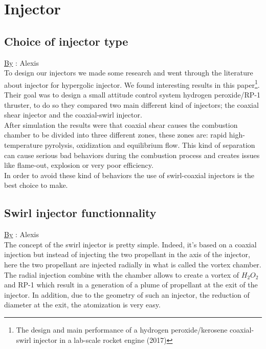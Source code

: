 \section{Injector}
\label{sec:inj}
\subsection{Choice of injector type}
\qquad \underline{By} : Alexis\\

To design our injectors we made some research and went through the literature about injector for hypergolic injector. We found interesting results in this paper\footnote{The design and main performance of a hydrogen peroxide/kerosene coaxial-swirl injector in a lab-scale rocket engine (2017)}. Their goal was to design a small attitude control system hydrogen peroxide/RP-1 thruster, to do so they compared two main different kind of injectors; the coaxial shear injector and the coaxial-swirl injector. \\

After simulation the results were that coaxial shear causes the combustion chamber to be divided into three different zones, these zones are: rapid high-temperature pyrolysis, oxidization and equilibrium flow. This kind of separation can cause serious bad behaviors during the combustion process and creates issues like flame-out, explosion or very poor efficiency. \\
In order to avoid these kind of behaviors the use of swirl-coaxial injectors is the best choice to make. \\

\subsection{Swirl injector functionnality}
\qquad \underline{By} : Alexis\\

The concept of the swirl injector is pretty simple. Indeed, it's based on a coaxial injection but instead of injecting the two propellant in the axis of the injector, here the two propellant are injected radially in what is called the vortex chamber. 
The radial injection combine with the chamber allows to create a vortex of $H_2O_2$ and RP-1 which result in a generation of a plume of propellant at the exit of the injector. In addition, due to the geometry of such an injector, the reduction of diameter at the exit, the atomization is very easy.

